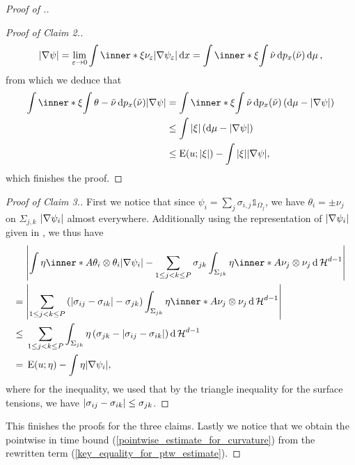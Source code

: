 \begin{proof}[Proof of .]
\begin{proof}[Proof of Claim 2.]
\begin{equation*}
			\abs{ \nabla \psi }
			=
			\lim_{ \varepsilon \to 0 }
			\int
			\inner*{ \xi }{ \nu_{ \varepsilon } }
			\abs{ \nabla \psi_{ \varepsilon } }
			\dd{ x }
			=
			\int
			\inner*{ \xi }{
				\int 
				\tilde{ \nu } 
				\dd{ p_{ x } ( \tilde{ \nu } ) } 
			}
			\dd{ \mu },
		\end{equation*}
		from which we deduce that
		\begin{align*}
			\int
			\inner*{ \xi }{
				\int
				\theta - \tilde{ \nu }
				\dd{ p_{ x } ( \tilde{ \nu } ) }
			}
			\abs{ \nabla \psi }
			& =
			\int
			\inner*{ \xi }{
				\int
				\tilde{ \nu }
				\dd{ p_{ x } ( \tilde{ \nu } ) }
			}
			\left(
			\dd{ \mu } - \abs{ \nabla \psi }
			\right)
			\\
			& \leq
			\int
			\abs{ \xi }
			\left(
			\dd{ \mu } - \abs{ \nabla \psi }
			\right)
			\\
			& \leq
			\energy ( u ; \abs{ \xi } )
			-
			\int
			\abs{ \xi }
			\abs{ \nabla \psi },
		\end{align*}
		which finishes the proof.
	\end{proof}
	
	\begin{proof}[Proof of Claim 3.]
		First we notice that since $ \psi_{ i } = \sum_{ j } \sigma_{ i , j } 
		\mathds{ 1 }_{ \Omega_{ j } } $, we have $ \theta_{ i } = \pm \nu_{ j } 
		$ on $ \Sigma_{ j , k } $ $ \abs{ \nabla \psi_{ i } }$ almost 
		everywhere.
		Additionally using the representation of $ \abs{ \nabla \psi_{ i } } $ 
		given in 
		, we thus have
		\begin{align*}
			&
			\abs{
				\int
				\eta 
				\inner*{ A }
				{ \theta_{ i } \otimes \theta_{ i } }
				\abs{ \nabla \psi_{ i } }
				-
				\sum_{ 1 \leq j < k \leq P }
				\sigma_{ j k }
				\int_{ \Sigma_{ j k } }
				\eta
				\inner*{ A }{ \nu_{ j } \otimes \nu_{ j } }
				\dd{ \hm^{ d - 1 } }
			}
			\\
			={} &
			\abs{ 
				\sum_{ 1 \leq j < k \leq P }
				\left( 
				\abs{ \sigma_{ i j } - \sigma_{ i k } }
				-
				\sigma_{ j k }
				\right)
				\int_{ \Sigma_{ j k  } }
				\eta
				\inner*{ A }{ \nu_{ j } \otimes \nu_{ j } }
				\dd{ \hm^{ d - 1 } }
			}
			\\
			\leq{} &
			\sum_{ 1 \leq j < k \leq P }
			\int_{ \Sigma_{ j k } }
			\eta
			\left(
			\sigma_{ j  k } - \abs{ \sigma_{ i j } - \sigma_{ i 
					k } }
			\right)
			\dd{ \hm^{ d - 1 } }
			\\
			={} &
			\energy ( u ; \eta )
			-
			\int
			\eta
			\abs{ \nabla \psi_{ i } },
		\end{align*}
		where for the inequality, we used that by the triangle inequality for 
		the surface tensions, we have
		$ \abs{ \sigma_{ i j } - \sigma_{ i k } } \leq \sigma_{ j k } $.
	\end{proof}
	This finishes the proofs for the three claims. Lastly we notice that we 
	obtain the pointwise in time bound (\ref{pointwise_estimate_for_curvature}) 
	from the rewritten term (\ref{key_equality_for_ptw_estimate}).
\end{proof}

